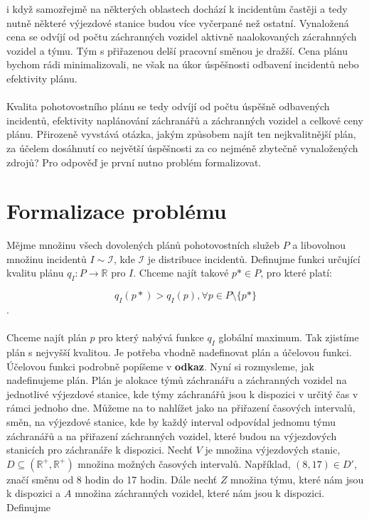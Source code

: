 i když samozřejmě na některých oblastech dochází k incidentům častěji a tedy nutně některé výjezdové stanice budou více vyčerpané než ostatní.
Vynaložená cena se odvíjí od počtu záchranných vozidel aktivně naalokovaných zácrahnných vozidel a týmu. Tým s přiřazenou delší pracovní směnou je dražší.
Cena plánu bychom rádi minimalizovali, ne však na úkor úspěšnosti odbavení incidentů nebo efektivity plánu.
\\\\
Kvalita pohotovostního plánu se tedy odvíjí od počtu úspěšně odbavených incidentů, efektivity naplánování záchranářů a záchranných vozidel a celkové ceny plánu.
Přirozeně vyvstává otázka, jakým způsobem najít ten nejkvalitnější plán, za účelem dosáhnutí co největší úspěšnosti za co nejméně zbytečně vynaložených zdrojů? 
Pro odpověď je první nutno problém formalizovat.

\clearpage

\section{Formalizace problému}

Mějme množinu všech dovolených plánů pohotovostních služeb $P$ a libovolnou množinu incidentů $I \sim \mathcal{I}$, kde $\mathcal{I}$ je distribuce incidentů. 
Definujme funkci určující kvalitu plánu $q_I\colon P \rightarrow \mathbb{R}$ pro $I$.
Chceme najít takové $p* \in P$, pro které platí:

$$
q_I(p*) > q_I(p), \forall p \in P \setminus \{p*\}
$$
.
\\
\\
Chceme najít plán $p$ pro který nabývá funkce $q_I$ globální maximum. Tak zjistíme plán s nejvyšší kvalitou.
Je potřeba vhodně nadefinovat plán a účelovou funkci. 
Účelovou funkci podrobně popíšeme v %
\textbf{odkaz}.
Nyní si rozmysleme, jak nadefinujeme plán.
Plán je alokace týmů záchranářu a záchranných vozidel na jednotlivé výjezdové stanice, kde týmy záchranářů jsou k dispozici v určitý čas v rámci jednoho dne.
Můžeme na to nahlížet jako na přiřazení časových intervalů, směn, na výjezdové stanice, kde by každý interval odpovídal jednomu týmu záchranářů a na přiřazení záchranných vozidel,
které budou na výjezdových stanicích pro záchranáře k dispozici.
Nechť $V$ je množina výjezdových stanic, $D \subseteq (\mathbb{R^+}, \mathbb{R^+})$ množina možných časových intervalů.
Například, $(8, 17) \in D'$, značí směnu od 8 hodin do 17 hodin.
Dále nechť $Z$ množina týmu, které nám jsou k dispozici a $A$ množina záchranných vozidel, které nám jsou k dispozici. Definujme

